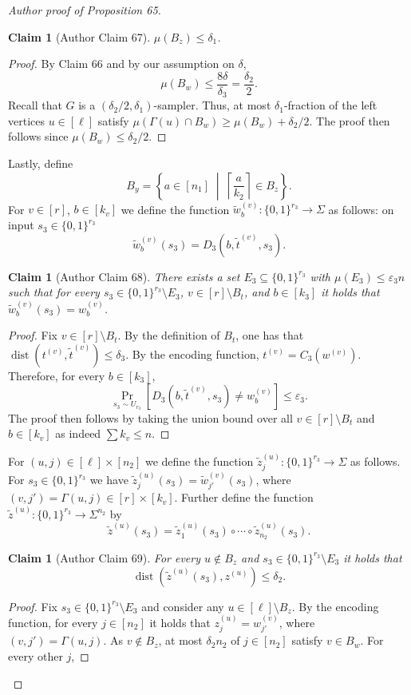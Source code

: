 \documentclass[10pt,a4paper]{article}
\newtheorem{ntclaim}[nttheorem]{Claim}
\begin{document}
\begin{proof}[Author proof of Proposition 65]
\begin{ntclaim}[Author Claim 67] $\mu(B_z)\leq\delta_1$.\end{ntclaim}
\begin{proof}
By Claim 66 and by our assumption on $\delta$,
\[\mu(B_w)\leq\frac{8\delta}{\delta_3}=\frac{\delta_2}{2}.\]
Recall that $G$ is a $(\delta_2/2,\delta_1)$-sampler. Thus, at most $\delta_1$-fraction of the left vertices $u\in[\ell]$ satisfy $\mu(\Gamma(u)\cap B_w)\geq\mu(B_w)+\delta_2/2$. The proof then follows since $\mu(B_w)\leq\delta_2/2$.
\end{proof}
Lastly, define
\[B_y=\left\{a\in[n_1]\;\middle|\;\left\lceil\frac a{k_2}\right\rceil\in B_z\right\}.\]
For $v\in[r]$, $b\in[k_v]$ we define the function $\widetilde w_b^{(v)}:\{0,1\}^{r_3}\to\Sigma$ as follows: on input $s_3\in\{0,1\}^{r_3}$
\[\widetilde w_b^{(v)}(s_3)=D_3(b,\widetilde t^{(v)},s_3).\]
\begin{ntclaim}[Author Claim 68]
There exists a set $E_3\subseteq\{0,1\}^{r_3}$ with $\mu(E_3)\leq\varepsilon_3n$ such that for every $s_3\in\{0,1\}^{r_3}\setminus E_3$, $v\in[r]\setminus B_t$, and $b\in[k_3]$ it holds that $\widetilde w_b^{(v)}(s_3)=w_b^{(v)}$.
\end{ntclaim}
\begin{proof}
Fix $v\in[r]\setminus B_t$. By the definition of $B_t$, one has that $\operatorname{dist}(t^{(v)},\widetilde t^{(v)})\leq\delta_3$. By the encoding function, $t^{(v)}=C_3(w^{(v)})$. Therefore, for every $b\in[k_3]$,
\[\Pr_{s_3\sim U_{r_3}}[D_3(b,\widetilde t^{(v)},s_3)\ne w_b^{(v)}]\leq\varepsilon_3.\]
The proof then follows by taking the union bound over all $v\in[r]\setminus B_t$ and $b\in[k_v]$ as indeed $\sum k_v\leq n$.
\end{proof}
For $(u,j)\in[\ell]\times[n_2]$ we define the function $\widetilde z_j^{(u)}:\{0,1\}^{r_3}\to\Sigma$ as follows. For $s_3\in\{0,1\}^{r_3}$ we have $\widetilde z_j^{(u)}(s_3)=\widetilde w_{j'}^{(v)}(s_3)$, where $(v,j')=\Gamma(u,j)\in[r]\times[k_v]$. Further define the function $\widetilde z^{(u)}:\{0,1\}^{r_3}\to\Sigma^{n_2}$ by
\[\widetilde z^{(u)}(s_3)=\widetilde z_1^{(u)}(s_3)\circ\cdots\circ\widetilde z_{n_2}^{(u)}(s_3).\]
\begin{ntclaim}[Author Claim 69]
For every $u\notin B_z$ and $s_3\in\{0,1\}^{r_3}\setminus E_3$ it holds that
\[\operatorname{dist}(\widetilde z^{(u)}(s_3),z^{(u)})\leq\delta_2.\]
\end{ntclaim}
\begin{proof}
Fix $s_3\in\{0,1\}^{r_3}\setminus E_3$ and consider any $u\in[\ell]\setminus B_z$. By the encoding function, for every $j\in[n_2]$ it holds that $z_j^{(u)}=w_{j'}^{(v)}$, where $(v,j')=\Gamma(u,j)$. As $v\notin B_z$, at most $\delta_2n_2$ of $j\in[n_2]$ satisfy $v\in B_w$. For every other $j$,

\end{proof}
\end{proof}
\end{document}
